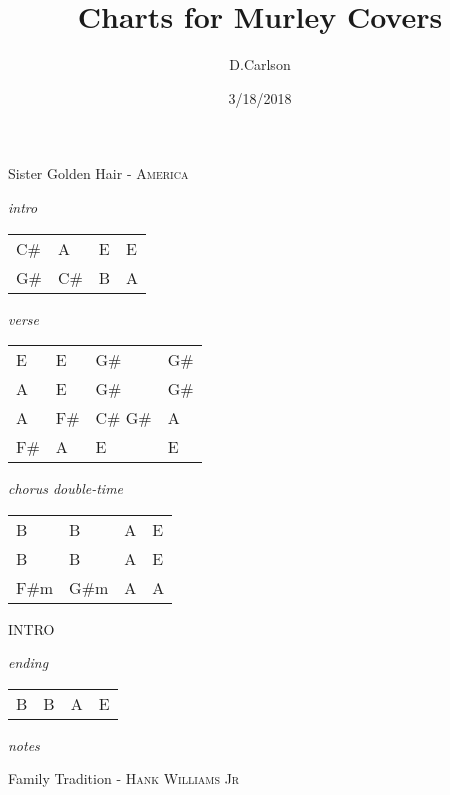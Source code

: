 \documentclass[12pt]{article}
\begin{document}
\title{\bf Charts for Murley Covers}
\author{D.Carlson}
\date{3/18/2018}
\renewcommand{\familydefault}{\sfdefault}
\renewcommand{\seriesdefault}{\bfdefault}

{\Huge Sister Golden Hair} {\huge - \textsc{America}}

\huge
\textit{intro}

\begin{tabular}{|P{1.25in}|P{1.25in}|P{1.25in}|P{1.25in}|}
  C\# & A & E & E \\
  G\# & C\# & B & A \\
\end{tabular}

\textit{verse}

\begin{tabular}{|P{1.25in}|P{1.25in}|P{1.25in}|P{1.25in}|}
  E & E & G\# & G\# \\
  A & E & G\# & G\#  \\
  A & F\# & C\# G\# & A \\
  F\# & A & E & E \\
\end{tabular}

\textit{chorus \normalsize double-time}

\begin{tabular}{|P{1.25in}|P{1.25in}|P{1.25in}|P{1.25in}|}
  B     &   B     &  A  &  E   \\
  B     &   B     &  A  &  E   \\
  F\#m  &   G\#m  &  A  &  A   \\
\end{tabular}

{\huge INTRO}

\textit{ending}

\begin{tabular}{|P{1.25in}|P{1.25in}|P{1.25in}|P{1.25in}|}
  B     &  B      &   A    &  E    \\
\end{tabular}

\textit{notes}


\newpage


{\Huge Family Tradition} {\huge - \textsc{Hank Williams Jr}}
\end{document}
